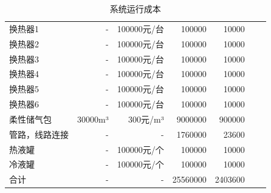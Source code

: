 \documentclass[journal,onecolumn]{IEEEtran}
\begin{document}
\begin{table}[h]
{\begin{tabular}{|l|r|r|r|r|c|c|}
			换热器1    & -       & 100000元/台 & 100000   & 10000   &  &  \\ \cline{1-5}
			换热器2    & -       & 100000元/台 & 100000   & 10000   &  &  \\ \cline{1-5}
			换热器3    & -       & 100000元/台 & 100000   & 10000   &  &  \\ \cline{1-5}
			换热器4    & -       & 100000元/台 & 100000   & 10000   &  &  \\ \cline{1-5}
			换热器5    & -       & 100000元/台 & 100000   & 10000   &  &  \\ \cline{1-5}
			换热器6    & -       & 100000元/台 & 100000   & 10000   &  &  \\ \cline{1-5}
			柔性储气包   & 30000m³ & 300元/m³   & 9000000  & 900000  &  &  \\ \cline{1-5}
			管路，线路连接 & -       & -         & 1760000  & 23600   &  &  \\ \cline{1-5}
			热液罐     & -       & 100000元/个 & 100000   & 10000   &  &  \\ \cline{1-5}
			冷液罐     & -       & 100000元/个 & 100000   & 10000   &  &  \\ \cline{1-5}
			合计      & -       & -         & 25560000 & 2403600 &  &  \\ \hline
		\end{tabular}
	}
	\caption{系统运行成本}
	\label{tab:my-table5}
\end{table}
\end{document}
